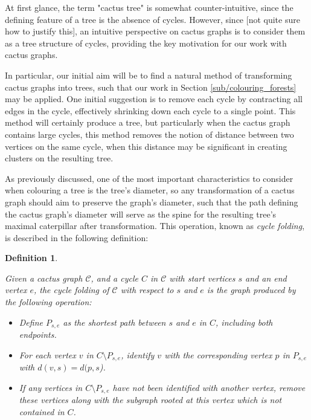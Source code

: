 \documentclass{mpaper}
\newtheorem{definition}[theorem]{Definition}
\begin{document}
At first glance, the term "cactus tree" is somewhat counter-intuitive, since the defining feature of a tree is the absence of cycles. However, since [not quite sure how to justify this], an intuitive perspective on cactus graphs is to consider them as a tree structure of cycles, providing the key motivation for our work with cactus graphs.

In particular, our initial aim will be to find a natural method of transforming cactus graphs into trees, such that our work in Section \ref{sub/colouring_forests} may be applied. One initial suggestion is to remove each cycle by contracting all edges in the cycle, effectively shrinking down each cycle to a single point. This method will certainly produce a tree, but particularly when the cactus graph contains large cycles, this method removes the notion of distance between two vertices on the same cycle, when this distance may be significant in creating clusters on the resulting tree.

As previously discussed, one of the most important characteristics to consider when colouring a tree is the tree's diameter, so any transformation of a cactus graph should aim to preserve the graph's diameter, such that the path defining the cactus graph's diameter will serve as the spine for the resulting tree's maximal caterpillar after transformation. This operation, known as \emph{cycle folding}, is described in the following definition:

\begin{definition}
\label{def/cycle-folding}


Given a cactus graph $\mathcal{C}$, and a cycle $C$ in $\mathcal{C}$ with start vertices $s$ and an end vertex $e$, the \emph{cycle folding} of $\mathcal{C}$ with respect to $s$ and $e$ is the graph produced by the following operation:

\begin{itemize}
  \item Define $P_{s,e}$ as the shortest path between $s$ and $e$ in $C$, including both endpoints.
  \item For each vertex $v$ in $C \setminus P_{s,e}$, identify $v$ with the corresponding vertex $p$ in $P_{s,e}$ with $d(v,s) = d(p,s$).
  \item If any vertices in $C \setminus P_{s,e}$ have not been identified with another vertex, remove these vertices along with the subgraph rooted at this vertex which is not contained in $C$.
\end{itemize}

\end{definition}
\end{document}
